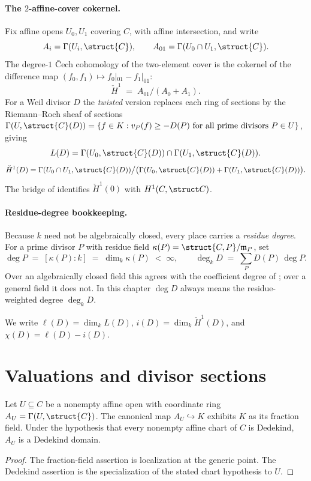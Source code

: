 \paragraph{The \(2\)-affine-cover cokernel.}
Fix affine opens \(U_0,U_1\) covering \(C\), with affine intersection, and
write
\[
  A_i = \Gamma(U_i, \struct{C}), \qquad
  A_{01} = \Gamma(U_0 \cap U_1, \struct{C}).
\]
The degree-\(1\) Čech cohomology of the two-element cover is the cokernel
of the difference map \((f_0, f_1) \mapsto f_0|_{01} - f_1|_{01}\):
\[
  \check{H}^1 \;=\; A_{01} \big/ (A_0 + A_1).
\]
For a Weil divisor \(D\) the \emph{twisted} version replaces each ring of
sections by the Riemann--Roch sheaf of sections
\(\Gamma(U, \struct{C}(D)) = \{ f \in K : v_P(f) \ge -D(P) \text{ for all
prime divisors } P \in U\}\), giving
\[
  L(D) = \Gamma(U_0, \struct{C}(D)) \cap \Gamma(U_1, \struct{C}(D)).
\]
\[
  \check{H}^1(D) = \Gamma(U_0 \cap U_1, \struct{C}(D)) \big/
    \bigl(\Gamma(U_0, \struct{C}(D)) + \Gamma(U_1, \struct{C}(D))\bigr).
\]
The bridge of  identifies
\(\check H^1(0)\) with \(H^1(C,\struct C)\).

\paragraph{Residue-degree bookkeeping.}
Because \(k\) need not be algebraically closed, every place carries a
\emph{residue degree}. For a prime divisor \(P\) with residue field
\(\kappa(P) = \struct{C, P}/\mathfrak{m}_P\), set
\[
  \deg P \;=\; [\kappa(P) : k] \;=\; \dim_k \kappa(P) \;<\; \infty,
  \qquad
  \deg_k D \;=\; \sum_P D(P)\,\deg P .
\]
Over an algebraically closed field this agrees with the coefficient degree
of ; over a general field it does not.  In this
chapter \(\deg D\) always means the residue-weighted degree \(\deg_kD\).

We write \(\ell(D) = \dim_k L(D)\),
\(i(D) = \dim_k \check{H}^1(D)\), and
\(\chi(D) = \ell(D) - i(D)\).

\section{Valuations and divisor sections}
\label{sec:RiemannRoch_Adelic_substrate}

\begin{proposition}
  \label{thm:adelic_chartRing_isDedekindDomain}
  \leanok
  Let \(U \subseteq C\) be a nonempty affine open with coordinate ring
  \(A_U = \Gamma(U, \struct{C})\).  The canonical map
  \(A_U\hookrightarrow K\) exhibits \(K\) as its fraction field.  Under
  the hypothesis that every nonempty affine chart of \(C\) is Dedekind,
  \(A_U\) is a Dedekind domain.
\end{proposition}
\begin{proof}
  \leanok
  The fraction-field assertion is localization at the generic point.
  The Dedekind assertion is the specialization of the stated chart
  hypothesis to \(U\).
\end{proof}

